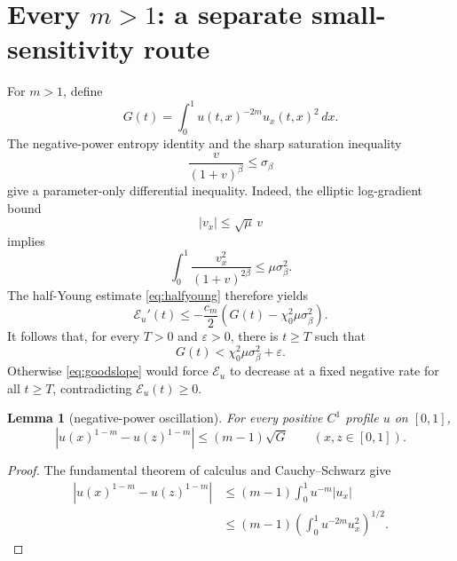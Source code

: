 \documentclass[11pt]{article}
\newcommand{\abs}[1]{\left\lvert #1\right\rvert}
\newtheorem{lemma}{Lemma}
\begin{document}
\section{Every \(m>1\): a separate small-sensitivity route}

For \(m>1\), define
\begin{equation}
 G(t)=\int_0^1u(t,x)^{-2m}u_x(t,x)^2\,dx.               \label{eq:negG}
\end{equation}
The negative-power entropy identity and the sharp saturation inequality
\[
 \frac{v}{(1+v)^\beta}\le\sigma_\beta
\]
give a parameter-only differential inequality.  Indeed, the elliptic
log-gradient bound
\[
 \abs{v_x}\le\sqrt\mu\,v
\]
implies
\[
 \int_0^1\frac{v_x^2}{(1+v)^{2\beta}}
 \le\mu\sigma_\beta^2.
\]
The half-Young estimate \eqref{eq:halfyoung} therefore yields
\begin{equation}
 \mathcal E_u'(t)
 \le-\frac{c_m}{2}
 \left(G(t)-\chi_0^2\mu\sigma_\beta^2\right).           \label{eq:goodslope}
\end{equation}
It follows that, for every \(T>0\) and
\(\varepsilon>0\), there is \(t\ge T\) such that
\begin{equation}
 G(t)<\chi_0^2\mu\sigma_\beta^2+\varepsilon.            \label{eq:goodslice}
\end{equation}
Otherwise \eqref{eq:goodslope} would force \(\mathcal E_u\) to decrease at a
fixed negative rate for all \(t\ge T\), contradicting
\(\mathcal E_u(t)\ge0\).

\begin{lemma}[negative-power oscillation]
For every positive \(C^1\) profile \(u\) on \([0,1]\),
\begin{equation}
 \abs{u(x)^{1-m}-u(z)^{1-m}}
 \le(m-1)\sqrt{G}
 \qquad(x,z\in[0,1]).                                  \label{eq:osc}
\end{equation}
\end{lemma}

\begin{proof}
The fundamental theorem of calculus and Cauchy--Schwarz give
\begin{align*}
 \abs{u(x)^{1-m}-u(z)^{1-m}}
 &\le(m-1)\int_0^1u^{-m}\abs{u_x}\\
 &\le(m-1)
 \left(\int_0^1u^{-2m}u_x^2\right)^{1/2}.
\end{align*}
\end{proof}
\end{document}
